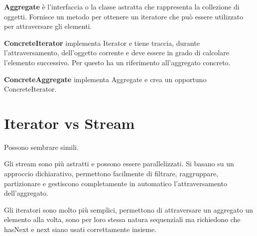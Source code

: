 \textbf{Aggregate} è l'interfaccia o la classe astratta che rappresenta la collezione di oggetti. 
Fornisce un metodo per ottenere un iteratore che può essere utilizzato per attraversare gli elementi.

\textbf{ConcreteIterator} implementa Iterator e tiene traccia, durante l’attraversamento, dell’oggetto corrente e deve essere in grado di calcolare l’elemento successivo.
Per questo ha un riferimento all’aggregato concreto.

\textbf{ConcreteAggregate}  implementa Aggregate e crea un opportuno ConcreteIterator.

\section{Iterator vs Stream}

Possono sembrare simili.

Gli stream sono più astratti e possono essere parallelizzati.
Si basano su un approccio dichiarativo, permettono facilmente di filtrare, raggruppare, partizionare e gestiscono completamente in automatico l’attraversamento dell’aggregato.

Gli iteratori sono molto più semplici, permettono di attraversare un aggregato un elemento alla volta, sono per loro stessa natura sequenziali ma richiedono che hasNext e next siano usati correttamente insieme.